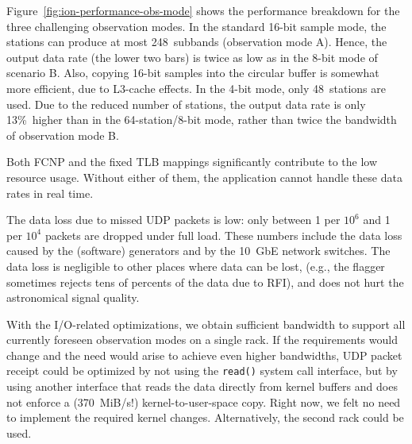 \documentclass{sig-alternate}
\begin{document}
Figure~\ref{fig:ion-performance-obs-mode} shows the performance breakdown
for the three challenging observation modes.
In the standard 16-bit sample mode, the stations can produce at most
248~subbands (observation mode \textsf{A}).
Hence, the output data rate (the lower two bars) is twice as low as in the
8-bit mode of scenario \textsf{B}.
Also, copying 16-bit samples into the circular buffer is somewhat more
efficient, due to L3-cache effects.
In the 4-bit mode, only 48~stations are used.
Due to the reduced number of stations, the output data rate is only 13\%~higher
than in the 64-station/8-bit mode, rather than twice the bandwidth of
observation mode \textsf{B}.



Both FCNP and the fixed TLB mappings significantly contribute to the low
resource usage.
Without either of them, the application cannot handle these data rates in
real time.

The data loss due to missed UDP packets is low: only between 1 per $10^6$ and
1 per $10^4$ packets are dropped under full load.
These numbers include the data loss caused by the (software) generators and by
the 10~GbE network switches.
The data loss is negligible to other places where data can be lost,
(e.g., the flagger sometimes rejects tens of percents of the data due to RFI),
and does not hurt the astronomical signal quality.

With the I/O-related optimizations, we obtain sufficient bandwidth to
support all currently foreseen observation modes on a single rack.
If the requirements would change and the need would arise to achieve even
higher bandwidths, UDP packet receipt could be optimized by not using the
\texttt{read()} system call interface,
but by using another interface that reads the data directly from kernel buffers
and does not enforce a (370~MiB/s!) kernel-to-user-space copy.
Right now, we felt no need to implement the required kernel changes.
Alternatively, the second rack could be used.
\end{document}
